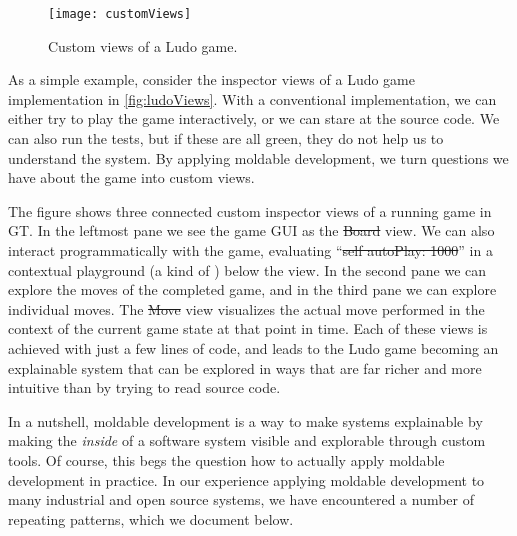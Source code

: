 \documentclass[sigconf]{acmart}
\renewcommand{\nbc}[3]{} %
\newcommand\tg[1]{\nbc{TG}{#1}{blue}}
\newcommand\tk[1]{\nbc{Timo}{#1}{cyan}}
\newcommand\kh[1]{\nbc{Konrad}{#1}{violet}}
\newcommand\eog[1]{\nbc{Edward}{#1}{purple}}
\newcommand{\GT}{\lst{GT}\xspace} %
\begin{document}


\begin{figure}[h]
  \texttt{[image: customViews]}
  \caption{Custom views of a Ludo game.}
  \label{fig:ludoViews}
\end{figure}


As a simple example, consider the inspector views of a Ludo game implementation in \autoref{fig:ludoViews}.
With a conventional implementation, we can either try to play the game interactively, or we can stare at the source code.
We can also run the tests, but if these are all green, they do not help us to understand the system.
By applying moldable development, we turn questions we have about the game into custom views.

The figure shows three connected custom inspector views of a running game in GT.
In the leftmost pane we see the game GUI as the \st{Board} view.
We can also interact programmatically with the game, evaluating ``\st{self autoPlay: 1000}'' in a contextual playground (a kind of ) below the view. %
In the second pane we can explore the moves of  the completed game, and in the third pane we can explore individual moves.
The \st{Move} view visualizes the actual move performed in the context of the current game state at that point in time.
Each of these views is achieved with just a few lines of code, and leads to the Ludo game becoming an explainable system that can be explored in ways that are far richer and more intuitive than by trying to read source code.

In a nutshell, moldable development is a way to make systems explainable by making the \emph{inside} of a software system visible and explorable through custom tools.
Of course, this begs the question how to actually apply moldable development in practice.
In our experience applying moldable development to many industrial and open source systems, we have encountered a number of repeating patterns, which we document below.
\end{document}
